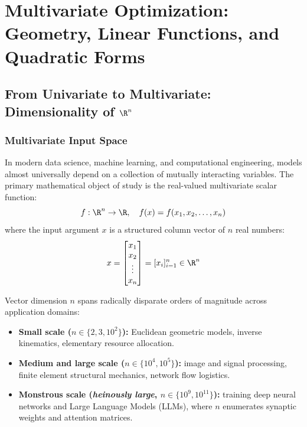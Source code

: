\chapter{Multivariate Optimization: Geometry, Linear Functions, and Quadratic Forms}
\label{chap:opt-multivariate-linear-quadratic}

\section{From Univariate to Multivariate: Dimensionality of \texorpdfstring{$\R^n$}{R\textasciicircum n}}
\label{sec:opt-dimensionality-rn-en}

\subsection{Multivariate Input Space}
In modern data science, machine learning, and computational engineering, models almost universally depend on a collection of mutually interacting variables. The primary mathematical object of study is the real-valued multivariate scalar function:
\begin{equation}
f: \R^n \to \R, \quad f(x) = f(x_1, x_2, \dots, x_n)
\end{equation}
where the input argument $x$ is a structured column vector of $n$ real numbers:
\begin{equation}
x = \begin{bmatrix} x_1 \\ x_2 \\ \vdots \\ x_n \end{bmatrix} = [x_i]_{i=1}^n \in \R^n
\end{equation}

Vector dimension $n$ spans radically disparate orders of magnitude across application domains:
\begin{itemize}
    \item \textbf{Small scale ($n \in \{2, 3, 10^2\}$):} Euclidean geometric models, inverse kinematics, elementary resource allocation.
    \item \textbf{Medium and large scale ($n \in \{10^4, 10^5\}$):} image and signal processing, finite element structural mechanics, network flow logistics.
    \item \textbf{Monstrous scale (\textit{heinously large}, $n \in \{10^9, 10^{11}\}$):} training deep neural networks and Large Language Models (LLMs), where $n$ enumerates synaptic weights and attention matrices.
\end{itemize}

